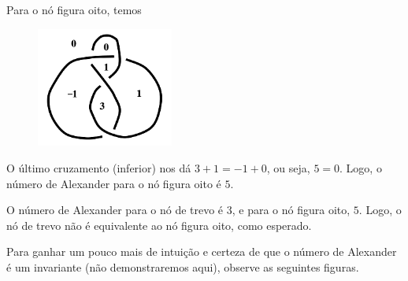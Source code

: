 	\par\vspace{0.3cm} Para o nó figura oito, temos
	\begin{figure}[H]
		\label{no de oito preenchido}
		\begin{center}
			\includegraphics[width=4.5cm]{Images/no_de_oito_preenchido.png}
		\end{center}
	\end{figure}
	\par\vspace{0.3cm} O último cruzamento (inferior) nos dá $3+1=-1+0$, ou seja, $5=0$. Logo, o número de Alexander para o nó figura oito é $5$.
	\par\vspace{0.3cm} O número de Alexander para o nó de trevo é $3$, e para o nó figura oito, $5$. Logo, o nó de trevo não é equivalente ao nó figura oito, como esperado.
	\par\vspace{0.3cm} Para ganhar um pouco mais de intuição e certeza de que o número de Alexander é um invariante (não demonstraremos aqui), observe as seguintes figuras.
